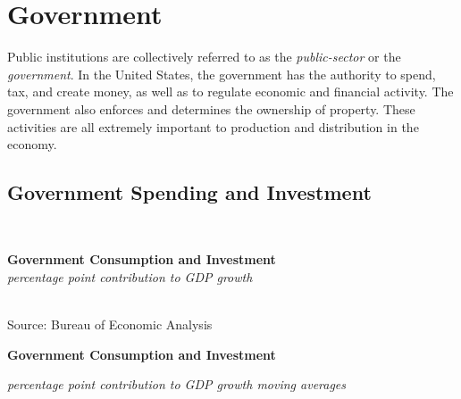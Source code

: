 \documentclass{report}
\makeatletter
\newcommand{\tbllink}[1]{\href{https://raw.githubusercontent.com/bdecon/US-chartbook/master/chartbook/data/#1}{\faTable}}
\newcommand*\short[1]{\expandafter\@gobbletwo\number\numexpr#1\relax}
\newcommand{\sbar}[4]{
		\addplot[ybar stacked, bar width=2.6pt, draw opacity=0, fill=#1] 
			table [x=#2, y=#3, col sep=comma]{#4};}
\newcommand{\dateaxisticks}{
		date coordinates in=x, axis line style={draw=none},
		xmax={2020-05-10},
		max space between ticks=40,	    
		xtick={{1990-01-01}, {1992-01-01}, {1994-01-01}, 
			{1996-01-01}, {1998-01-01}, {2000-01-01}, 
			{2002-01-01}, {2004-01-01}, {2006-01-01},
			{2008-01-01}, {2010-01-01}, {2012-01-01}, {2014-01-01},
		    {2016-01-01}, {2018-01-01}, {2020-01-01}},
		minor xtick={{1989-01-01}, {1991-01-01}, {1993-01-01},
			{1995-01-01}, {1997-01-01}, {1999-01-01}, 
			{2001-01-01}, {2003-01-01}, {2005-01-01}, {2007-01-01},
		    {2009-01-01}, {2011-01-01}, {2013-01-01}, {2015-01-01},
		    {2017-01-01}, {2019-01-01}},
		enlarge y limits={0.06}, enlarge x limits={0.01},
		}
\newcommand{\bbar}[2]{extra #1 ticks = {{#2}}, extra #1 tick labels = ,
		extra #1 tick style = {grid=major, grid style={thick, black!25}},}
\newcommand{\rbars}{
		\fill[color=black!10] (axis cs:{1990-07-01},\pgfkeysvalueof{/pgfplots/ymin}) rectangle 
			(axis cs:{1991-03-01}, \pgfkeysvalueof{/pgfplots/ymax});
		\fill[color=black!10] (axis cs:{2007-12-01},\pgfkeysvalueof{/pgfplots/ymin}) rectangle 
			(axis cs:{2009-07-01}, \pgfkeysvalueof{/pgfplots/ymax});
		\fill[color=black!10] (axis cs:{2001-03-01},\pgfkeysvalueof{/pgfplots/ymin}) rectangle 
			(axis cs:{2001-11-01}, \pgfkeysvalueof{/pgfplots/ymax});}
\makeatother
\begin{document}
{{{{{{\begin{minipage}{0.76\textwidth}
\end{minipage}

\newpage


\begin{minipage}{0.76\textwidth}
\section*{\color{darkgray}\LARGE \seriffont Government}
\label{sec:gov}
\normalsize

\small Public institutions are collectively referred to as the \textit{public-sector} or the \textit{government}. In the United States, the government has the authority to spend, tax, and create money, as well as to regulate economic and financial activity. The government also enforces and determines the ownership of property. These activities are all extremely important to production and distribution in the economy.


\subsection*{\color{black!70} \seriffont Government Spending and Investment}
\small   \\
\vspace{2mm}

\noindent \normalsize \textbf{Government Consumption and Investment}\\
\footnotesize{\textit{percentage point contribution to GDP growth}}\\
\noindent \hspace*{-2mm} \\
\footnotesize{Source: Bureau of Economic Analysis} \hfill \tbllink{gov.csv}

\end{minipage}
\vspace{6mm}

\noindent \normalsize \textbf{Government Consumption and Investment}\\
\footnotesize{\textit{percentage point contribution to GDP growth \hspace{41mm} moving averages}\\ \vspace{4mm}
\noindent {} \setlength{\tabcolsep}{3.1pt} \color{black!90}
		{\renewcommand{\arraystretch}{1.55}
		 \begin{tabular}{p{42mm} R{6.7mm} R{6.7mm} R{6.7mm} R{6.7mm} R{6.7mm} 
		   R{7.8mm} R{6.7mm} R{6.7mm} }
			 \hline
		\end{tabular}
		}	\\
		
}}}}}}}
\end{document}

